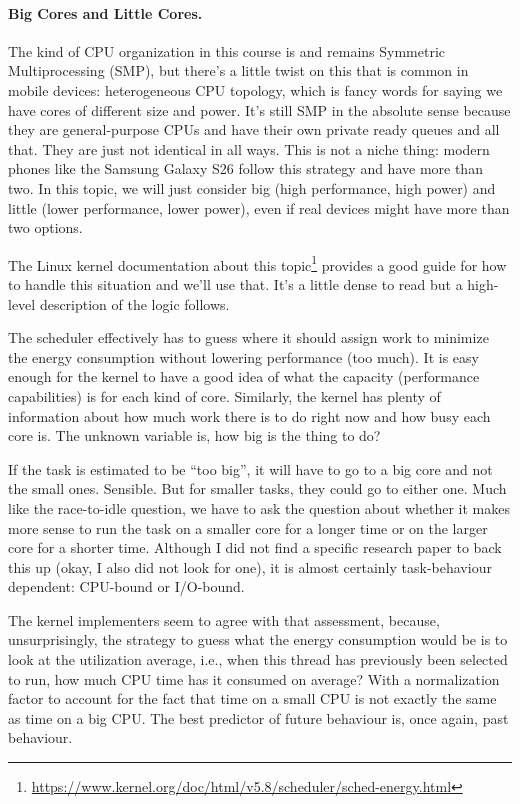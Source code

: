 \paragraph{Big Cores and Little Cores.} The kind of CPU organization in this course is and remains Symmetric Multiprocessing (SMP), but there's a little twist on this that is common in mobile devices: heterogeneous CPU topology, which is fancy words for saying we have cores of different size and power. It's still SMP in the absolute sense because they are general-purpose CPUs and have their own private ready queues and all that. They are just not identical in all ways. This is not a niche thing: modern phones like the Samsung Galaxy S26 follow this strategy and have more than two. In this topic, we will just consider big (high performance, high power) and little (lower performance, lower power), even if real devices might have more than two options.

The Linux kernel documentation about this topic\footnote{ \url{https://www.kernel.org/doc/html/v5.8/scheduler/sched-energy.html} } provides a good guide for how to handle this situation and we'll use that. It's a little dense to read but a high-level description of the logic follows.

The scheduler effectively has to guess where it should assign work to minimize the energy consumption without lowering performance (too much). It is easy enough for the kernel to have a good idea of what the capacity (performance capabilities) is for each kind of core. Similarly, the kernel has plenty of information about how much work there is to do right now and how busy each core is. The unknown variable is, how big is the thing to do?

If the task is estimated to be ``too big'', it will have to go to a big core and not the small ones. Sensible. But for smaller tasks, they could go to either one. Much like the race-to-idle question, we have to ask the question about whether it makes more sense to run the task on a smaller core for a longer time or on the larger core for a shorter time. Although I did not find a specific research paper to back this up (okay, I also did not look for one), it is almost certainly task-behaviour dependent: CPU-bound or I/O-bound. 

The kernel implementers seem to agree with that assessment, because, unsurprisingly, the strategy to guess what the energy consumption would be is to look at the utilization average, i.e., when this thread has previously been selected to run, how much CPU time has it consumed on average? With a normalization factor to account for the fact that time on a small CPU is not exactly the same as time on a big CPU. The best predictor of future behaviour is, once again, past behaviour.

